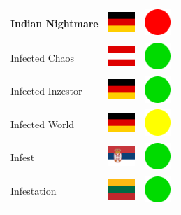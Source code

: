 \documentclass[12pt, a4paper, twoside]{report}
\begin{document}
\begin{center}
\begin{longtable}{|p{5cm}|p{2cm}|p{2cm}|}
 Indian Nightmare                                           & \includegraphics[width=1cm]{../img/flags/de} &   \includegraphics[width=1cm]{../likes/n} \\ \hline
 Infected Chaos                                             & \includegraphics[width=1cm]{../img/flags/at} &   \includegraphics[width=1cm]{../likes/y} \\ \hline
 Infected Inzestor                                          & \includegraphics[width=1cm]{../img/flags/de} &   \includegraphics[width=1cm]{../likes/y} \\ \hline
 Infected World                                             & \includegraphics[width=1cm]{../img/flags/de} &   \includegraphics[width=1cm]{../likes/m} \\ \hline
 Infest                                                     & \includegraphics[width=1cm]{../img/flags/rs} &   \includegraphics[width=1cm]{../likes/y} \\ \hline
 Infestation                                                & \includegraphics[width=1cm]{../img/flags/lt} &   \includegraphics[width=1cm]{../likes/y} \\ \hline

\end{longtable}
\end{center}
\end{document}
